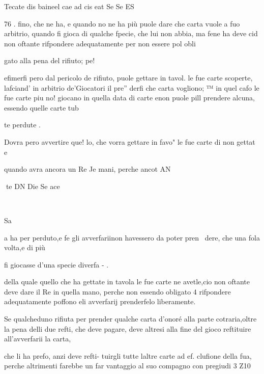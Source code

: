 \documentclass[11pt,a6paper]{article}
\begin{document}
 

Tecate dis baineel cae ad cis eat Se Se ES

 

 
 

 

 

 

 

76 .
fino, che ne ha, e quando no
ne ha più puole dare che carta
vuole a fuo arbitrio, quando fi
gioca di qualche fpecie, che lui
non abbia, ma fene ha deve cid
non oftante rifpondere adequatamente per non essere pol obli

gato alla pena del rifiuto; pe!

efimerfi pero dal pericolo de
rifiuto, puole gettare in tavol.
le fue carte scoperte, lafciand'
in arbitrio de’Giocatori il pre”
derfi che carta vogliono; ™
in quel cafo le fue carte piu no!
giocano in quella data di carte
enon puole pill prendere
alcuna, essendo quelle carte tub

te perdute .

Dovra pero avvertire que!
lo, che vorra gettare in favo"
le fue carte di non gettat e

quando avra ancora un Re
Je mani, perche ancot AN

 
te DN Die Se ace

~

Sa

 

 

a
ha per perduto,e fe gli avverfariinon havessero da poter pren~
dere, che una fola volta,e di più

fi giocasse d’una specie diverfa - .

della quale quello che ha gettate in tavola le fue carte ne
avetle,cio non oftante deve dare il Re in quella mano, perche
non essendo obligato 4 rifpondere adequatamente poffono eli
avverfarij prenderfelo liberamente.

Se qualcheduno rifiuta per
prender qualche carta d’onoré
alla parte cotraria,oltre la pena
delli due refti, che deve pagare,
deve altresi alla fine del gioco
reftituire all’avverfarii la carta,

che li ha prefo, anzi deve refti- 
tuirgli tutte laltre carte ad ef.
clufione della fua, perche altrimenti farebbe un far vantaggio
al suo compagno con pregiudi
3 Z10

 

 

 
\end{document}

